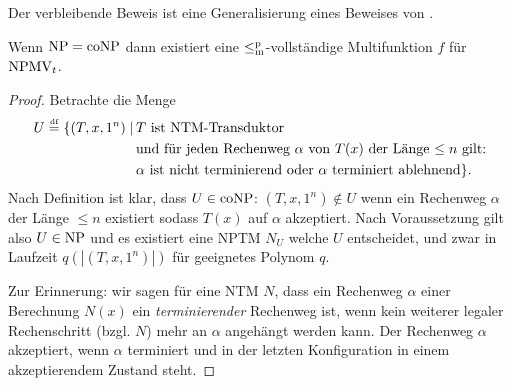 Der verbleibende Beweis ist eine Generalisierung eines Beweises von \textcite{dingel_separation_2022}.
\begin{theorem}\label{thm:npmvt-vs-npconp}
    Wenn $\mathrm{NP}=\mathrm{coNP}$ dann existiert eine $\leq_\mathrm{m}^\mathrm{p}$-vollständige Multifunktion $f$ für $\mathrm{NPMV}_t$.
\end{theorem}
\begin{proof}
    Betrachte die Menge
\[ \begin{split} U \stackrel{\text{{\normalfont\tiny df}}}{=}  \{ (T, x, 1^n) \mid \,&\text{$T$ ist NTM-Transduktor} \\ &\text{und für jeden Rechenweg $\alpha$ von $T(x)$ der Länge $\leq n$ gilt:} \\& \text{$\alpha$ ist nicht terminierend oder $\alpha$ terminiert ablehnend} \}. \end{split}  \]
    Nach Definition ist klar, dass $U\in\mathrm{coNP}$: $(T, x, 1^n)\not\in U$ wenn ein Rechenweg $\alpha$ der Länge $\leq n$ existiert sodass $T(x)$ auf $\alpha$ akzeptiert. Nach Voraussetzung gilt also $U\in\mathrm{NP}$ und es existiert eine NPTM $N_U$ welche $U$ entscheidet, und zwar in Laufzeit $q(|(T, x, 1^n)|)$ für geeignetes Polynom $q$.

    Zur Erinnerung: wir sagen für eine NTM $N$, dass ein Rechenweg $\alpha$ einer Berechnung $N(x)$ ein \emph{terminierender} Rechenweg ist, wenn kein weiterer legaler Rechenschritt (bzgl. $N$) mehr an $\alpha$ angehängt werden kann. Der Rechenweg $\alpha$ akzeptiert, wenn $\alpha$ terminiert und in der letzten Konfiguration in einem akzeptierendem Zustand steht.


\end{proof}
